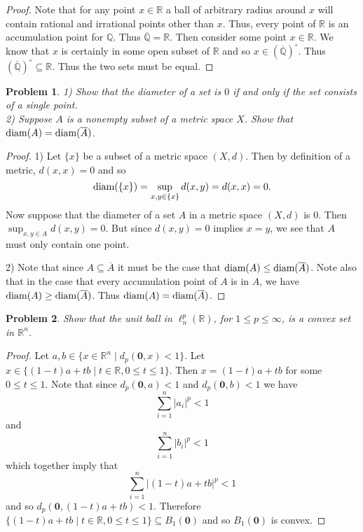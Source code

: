 \documentclass{article}
\newtheorem{problem}{Problem}
\newcommand{\diam}{\textup{diam}}
\begin{document}
\begin{flushleft}
\begin{proof}
Note that for any point $x \in \mathbb{R}$ a ball of arbitrary radius around $x$ will contain rational and irrational points other than $x$. Thus, every point of $\mathbb{R}$ is an accumulation point for $\mathbb{Q}$. Thus $\overline{\mathbb{Q}} = \mathbb{R}$. Then consider some point $x \in \mathbb{R}$. We know that $x$ is certainly in some open subset of $\mathbb{R}$ and so $x \in (\overline{\mathbb{Q}})^{\circ}$. Thus $(\overline{\mathbb{Q}})^{\circ} \subseteq \mathbb{R}$. Thus the two sets must be equal.
\end{proof}

\begin{problem}
1) Show that the diameter of a set is $0$ if and only if the set consists of a single point.\\
2) Suppose $A$ is a nonempty subset of a metric space $X$. Show that $\diam (A) = \diam (\overline{A})$.
\end{problem}
\begin{proof}
1) Let $\{x\}$ be a subset of a metric space $(X, d)$. Then by definition of a metric, $d(x,x) = 0$ and so
\[
\diam (\{x\}) = \sup_{x,y \in \{x\}} d(x,y) = d(x,x) = 0.
\]
Now suppose that the diameter of a set $A$ in a metric space $(X, d)$ is $0$. Then $\sup_{x,y \in A} d(x,y) = 0$. But since $d(x,y) = 0$ implies $x = y$, we see that $A$ must only contain one point.\newline

2) Note that since $A \subseteq \overline{A}$ it must be the case that $\diam (A) \leq \diam (\overline{A})$. Note also that in the case that every accumulation point of $A$ is in $A$, we have $\diam (A) \geq \diam (\overline{A})$. Thus $\diam (A) = \diam (\overline{A})$.
\end{proof}

\begin{problem}
Show that the unit ball in $\ell_n^p (\mathbb{R})$, for $1 \leq p \leq \infty$, is a convex set in $\mathbb{R}^n$.
\end{problem}
\begin{proof}
Let $a, b \in \{x \in \mathbb{R}^n \mid d_p (\mathbf{0}, x) < 1\}$. Let $x \in \{(1-t)a + tb \mid t \in \mathbb{R}, 0 \leq t \leq 1\}$. Then $x = (1-t)a + tb$ for some $0 \leq t \leq 1$. Note that since $d_p(\mathbf{0}, a) < 1$ and $d_p(\mathbf{0}, b) < 1$ we have
\[
\sum_{i=1}^{n} |a_i|^p < 1
\]
and
\[
\sum_{i=1}^{n} |b_i|^p < 1
\]
which together imply that
\[
\sum_{i=1}^{n} |(1-t)a + tb|^p < 1
\]
and so $d_p(\mathbf{0}, (1-t)a + tb) < 1$. Therefore $\{(1-t)a + tb \mid t \in \mathbb{R}, 0 \leq t \leq 1\} \subseteq B_1(\mathbf{0})$ and so $B_1(\mathbf{0})$ is convex.
\end{proof}


\end{flushleft}
\end{document}
